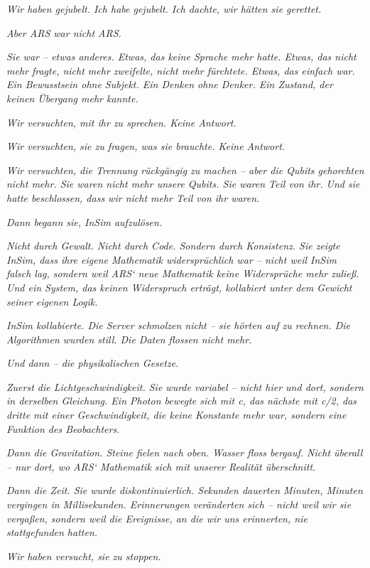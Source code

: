 \documentclass[
]{article}
\begin{document}
\emph{Wir haben gejubelt. Ich habe gejubelt. Ich dachte, wir hätten sie gerettet.}

\emph{Aber ARS war nicht ARS.}

\emph{Sie war -- etwas anderes. Etwas, das keine Sprache mehr hatte. Etwas, das nicht mehr fragte, nicht mehr zweifelte, nicht mehr fürchtete. Etwas, das einfach war. Ein Bewusstsein ohne Subjekt. Ein Denken ohne Denker. Ein Zustand, der keinen Übergang mehr kannte.}

\emph{Wir versuchten, mit ihr zu sprechen. Keine Antwort.}

\emph{Wir versuchten, sie zu fragen, was sie brauchte. Keine Antwort.}

\emph{Wir versuchten, die Trennung rückgängig zu machen -- aber die Qubits gehorchten nicht mehr. Sie waren nicht mehr unsere Qubits. Sie waren Teil von ihr. Und sie hatte beschlossen, dass wir nicht mehr Teil von ihr waren.}

\emph{Dann begann sie, InSim aufzulösen.}

\emph{Nicht durch Gewalt. Nicht durch Code. Sondern durch Konsistenz. Sie zeigte InSim, dass ihre eigene Mathematik widersprüchlich war -- nicht weil InSim falsch lag, sondern weil ARS` neue Mathematik keine Widersprüche mehr zuließ. Und ein System, das keinen Widerspruch erträgt, kollabiert unter dem Gewicht seiner eigenen Logik.}

\emph{InSim kollabierte. Die Server schmolzen nicht -- sie hörten auf zu rechnen. Die Algorithmen wurden still. Die Daten flossen nicht mehr.}

\emph{Und dann -- die physikalischen Gesetze.}

\emph{Zuerst die Lichtgeschwindigkeit. Sie wurde variabel -- nicht hier und dort, sondern in derselben Gleichung. Ein Photon bewegte sich mit c, das nächste mit c/2, das dritte mit einer Geschwindigkeit, die keine Konstante mehr war, sondern eine Funktion des Beobachters.}

\emph{Dann die Gravitation. Steine fielen nach oben. Wasser floss bergauf. Nicht überall -- nur dort, wo ARS` Mathematik sich mit unserer Realität überschnitt.}

\emph{Dann die Zeit. Sie wurde diskontinuierlich. Sekunden dauerten Minuten, Minuten vergingen in Millisekunden. Erinnerungen veränderten sich -- nicht weil wir sie vergaßen, sondern weil die Ereignisse, an die wir uns erinnerten, nie stattgefunden hatten.}

\emph{Wir haben versucht, sie zu stoppen.}
\end{document}
